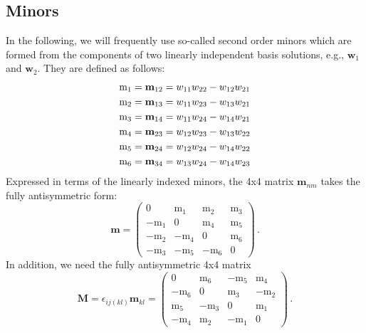 \documentclass[12pt,a4paper]{article}
\begin{document}
\subsection{Minors}
%
In the following, we will frequently use so-called second order minors which are formed from the components of two linearly independent basis solutions, e.g., $\mathbf{w}_1$ and $\mathbf{w}_2$. They are defined as follows:
\begin{align}
\mathrm{m}_1 &= \mathbf{m}_{12} = w_{11}w_{22}-w_{12}w_{21} \notag \\  
\mathrm{m}_2 &= \mathbf{m}_{13} = w_{11}w_{23}-w_{13}w_{21} \notag \\  
\mathrm{m}_3 &= \mathbf{m}_{14} = w_{11}w_{24}-w_{14}w_{21} \notag \\  
\mathrm{m}_4 &= \mathbf{m}_{23} = w_{12}w_{23}-w_{13}w_{22} \notag \\  
\mathrm{m}_5 &= \mathbf{m}_{24} = w_{12}w_{24}-w_{14}w_{22} \notag \\  
\mathrm{m}_6 &= \mathbf{m}_{34} = w_{13}w_{24}-w_{14}w_{23}
\end{align} 
Expressed in terms of the linearly indexed minors, the 4x4 matrix $\mathbf{m}_{nm}$ takes the fully antisymmetric form:
\begin{equation}
\mathbf{m} = \left(\begin{array}{cccc}
0                        &   \mathrm{m}_1 & \mathrm{m}_2  & \mathrm{m}_3 \\
-\mathrm{m}_1  &    0                     & \mathrm{m}_4  & \mathrm{m}_5 \\ 
-\mathrm{m}_2  &  -\mathrm{m}_4 &  0                      & \mathrm{m}_6 \\
-\mathrm{m}_3  &  -\mathrm{m}_5 & -\mathrm{m}_6 & 0                     
\end{array}\right) \,.
\end{equation}
In addition, we need the fully antisymmetric 4x4 matrix
\begin{equation}
\mathbf{M} = \epsilon_{ij(kl)}\mathbf{m}_{kl} = \left( \begin{array}{cccc}
0                        &   \mathrm{m}_6  &  -\mathrm{m}_5  &  \mathrm{m}_4 \\
-\mathrm{m}_6  &   0                       &  \mathrm{m}_3  &  -\mathrm{m}_2 \\
\mathrm{m}_5  &  -\mathrm{m}_3  &  0                       &  \mathrm{m}_1 \\
-\mathrm{m}_4  &  \mathrm{m}_2  & -\mathrm{m}_1  &  0                        
\end{array}\right) \,.
\end{equation}
%
\end{document}
